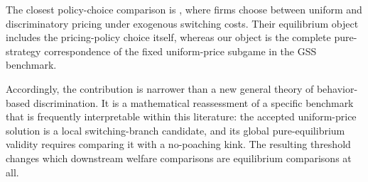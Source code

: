 The closest policy-choice comparison is \citet{JeongMaruyama2008}, where firms choose between uniform and discriminatory pricing under exogenous switching costs. Their equilibrium object includes the pricing-policy choice itself, whereas our object is the complete pure-strategy correspondence of the fixed uniform-price subgame in the GSS benchmark.

Accordingly, the contribution is narrower than a new general theory of behavior-based discrimination. It is a mathematical reassessment of a specific benchmark that is frequently interpretable within this literature: the accepted uniform-price solution is a local switching-branch candidate, and its global pure-equilibrium validity requires comparing it with a no-poaching kink. The resulting threshold changes which downstream welfare comparisons are equilibrium comparisons at all.
